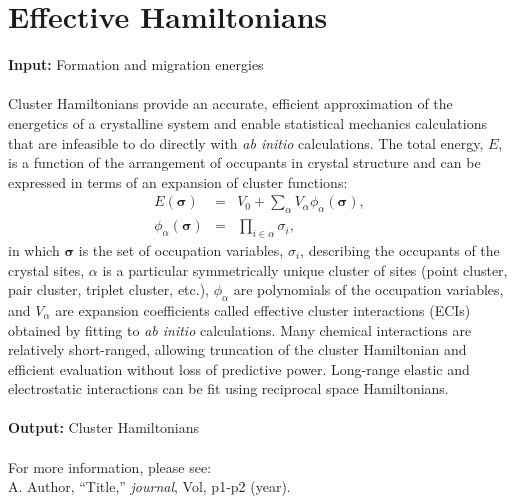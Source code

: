 \documentclass[12pt]{article}
\begin{document}
\section{Effective Hamiltonians}
 \textbf{Input:}  Formation and migration energies\\
\\
Cluster Hamiltonians provide an accurate, efficient approximation of the energetics of a crystalline system and enable statistical mechanics calculations that are infeasible to do directly with \emph{ab initio} calculations. The total energy, $E$, is a function of the arrangement of occupants in crystal structure and can be expressed in terms of an expansion of cluster functions:
\begin{eqnarray}
E(\bm{\sigma})&=&V_0 + \sum_\alpha V_\alpha \phi_\alpha(\bm{\sigma}), \\
\phi_\alpha(\bm{\sigma}) &=& \prod_{i \in \alpha} \sigma_i,
\end{eqnarray}
in which $\bm{\sigma}$ is the set of occupation variables, $\sigma_i$, describing the occupants of the crystal sites, $\alpha$ is a particular symmetrically unique cluster of sites (point cluster, pair cluster, triplet cluster, etc.), $\phi_\alpha$ are polynomials of the occupation variables, and $V_\alpha$ are expansion coefficients called effective cluster interactions (ECIs) obtained by fitting to \emph{ab initio} calculations. Many chemical interactions are relatively short-ranged, allowing truncation of the cluster Hamiltonian and efficient evaluation without loss of predictive power. Long-range elastic and electrostatic interactions can be fit using reciprocal space Hamiltonians.
\\
\\
\textbf{Output:} Cluster Hamiltonians \\
\\
For more information, please see:
\\
A. Author, ``Title,'' \textit{journal}, Vol, p1-p2 (year).

\end{document}
